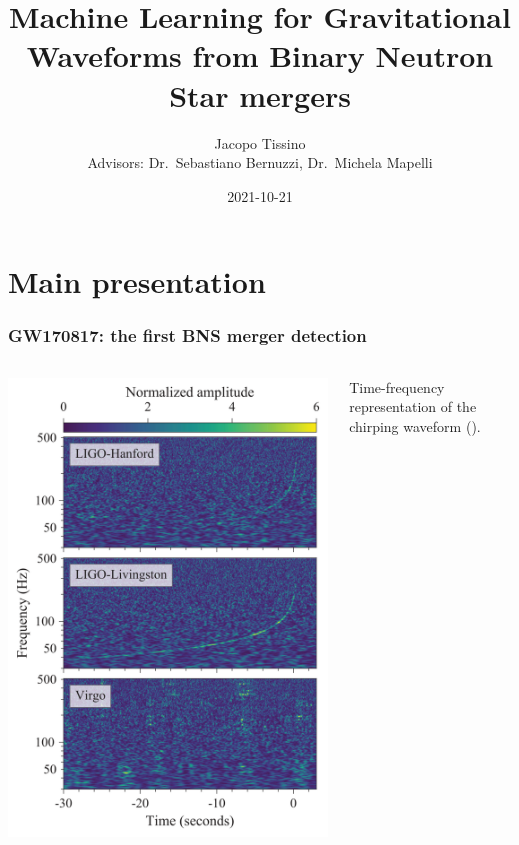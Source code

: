 \documentclass{beamer}
\title{Machine Learning for Gravitational Waveforms from Binary Neutron Star mergers}
\author{Jacopo Tissino \\ Advisors: Dr.\ Sebastiano Bernuzzi, Dr.\ Michela Mapelli}
\date{2021-10-21}
\begin{document}
\frame{\titlepage}

\section{Main presentation}

\begin{frame}
    \frametitle{GW170817: the first BNS merger detection}
    \begin{columns}
        
    \begin{column}{0.5\textwidth}
    \includegraphics[width=\textwidth]{figures/836px-GW170817_spectrograms.svg.png}
    \end{column}

    \begin{column}{0.5\textwidth}
    Time-frequency representation of the chirping waveform
    (\cite[]{abbottGW170817ObservationGravitational2017}).

    \end{column}
    \end{columns}
\end{frame}
\end{document}
